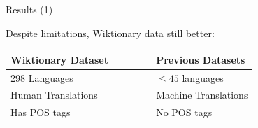 \documentclass{beamer}
\begin{document}

\begin{frame}{Results (1)}

    Despite limitations, Wiktionary data still better:

    \begin{center}
    \renewcommand*{\arraystretch}{1.95}
    \begin{tabular}{lcl}
        \toprule
        Wiktionary Dataset & ~~~~~ & Previous Datasets \\
        \midrule
        298 Languages      & & $\le45$ languages \\
        Human Translations & & Machine Translations \\
        Has POS tags       & & No POS tags            \\
        \bottomrule
    \end{tabular}
    \end{center}



%
\end{frame}
\end{document}
